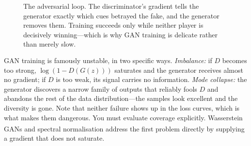 \begin{figure}[htbp]
\centering
{}
\caption{The adversarial loop. The discriminator's gradient tells the generator
exactly which cues betrayed the fake, and the generator removes them. Training
succeeds only while neither player is decisively winning---which is why GAN
training is delicate rather than merely slow.}
\label{fig:dl-gan}
\end{figure}

\begin{cautionbox}
GAN training is famously unstable, in two specific ways.
\emph{Imbalance:} if $D$ becomes too strong, $\log(1-D(G(z)))$ saturates and
the generator receives almost no gradient; if $D$ is too weak, its signal
carries no information. \emph{Mode collapse:} the generator discovers a narrow
family of outputs that reliably fools $D$ and abandons the rest of the data
distribution---the samples look excellent and the diversity is gone. Note that
neither failure shows up in the loss curves, which is what makes them
dangerous. You must evaluate coverage explicitly. Wasserstein
GANs\textsuperscript{\cite{arjovskyWassersteinGAN2017}} and spectral
normalisation address the first problem directly by supplying a gradient that
does not saturate.
\end{cautionbox}

